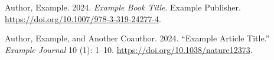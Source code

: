 \documentclass[
  letterpaper,
  DIV=11,
  numbers=noendperiod]{scrartcl}
\newlength{\cslhangindent}
\newenvironment{CSLReferences}[2] %
 {\begin{list}{}{%
  \setlength{\itemindent}{0pt}
  \setlength{\leftmargin}{0pt}
  \setlength{\parsep}{0pt}
  \ifodd #1
   \setlength{\leftmargin}{\cslhangindent}
   \setlength{\itemindent}{-1\cslhangindent}
  \fi
  \setlength{\itemsep}{#2\baselineskip}}}
 {\end{list}}
\begin{document}
\protect{}\label{refs}
\begin{CSLReferences}{1}{1}
Author, Example. 2024. \emph{Example Book Title}. Example Publisher.
\url{https://doi.org/10.1007/978-3-319-24277-4}.

Author, Example, and Another Coauthor. 2024. {``Example Article
Title.''} \emph{Example Journal} 10 (1): 1--10.
\url{https://doi.org/10.1038/nature12373}.

\end{CSLReferences}
\end{document}
